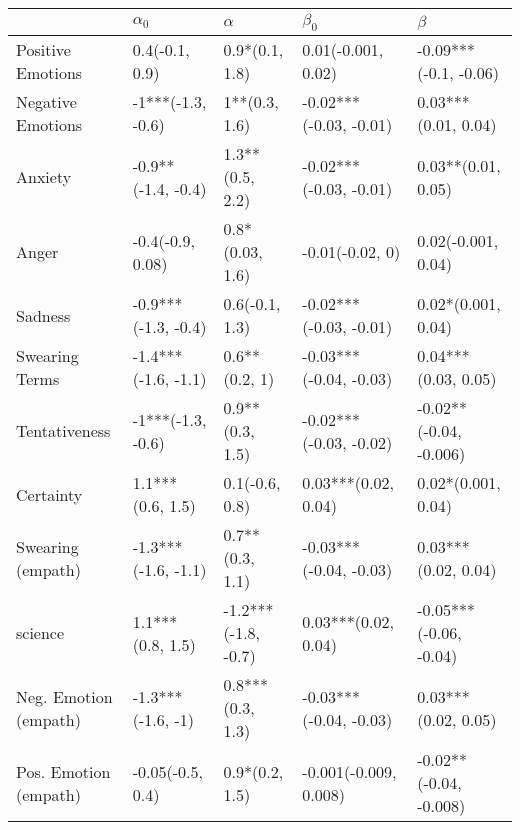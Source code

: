 \begin{tabular}{lllll}
\toprule
{} &           $\alpha_0$ &             $\alpha$ &               $\beta_0$ &                 $\beta$ \\
\midrule
Positive Emotions     &       0.4(-0.1, 0.9) &       0.9*(0.1, 1.8) &      0.01(-0.001, 0.02) &   -0.09***(-0.1, -0.06) \\
Negative Emotions     &    -1***(-1.3, -0.6) &        1**(0.3, 1.6) &  -0.02***(-0.03, -0.01) &     0.03***(0.01, 0.04) \\
Anxiety               &   -0.9**(-1.4, -0.4) &      1.3**(0.5, 2.2) &  -0.02***(-0.03, -0.01) &      0.03**(0.01, 0.05) \\
Anger                 &     -0.4(-0.9, 0.08) &      0.8*(0.03, 1.6) &         -0.01(-0.02, 0) &      0.02(-0.001, 0.04) \\
Sadness               &  -0.9***(-1.3, -0.4) &       0.6(-0.1, 1.3) &  -0.02***(-0.03, -0.01) &      0.02*(0.001, 0.04) \\
Swearing Terms        &  -1.4***(-1.6, -1.1) &        0.6**(0.2, 1) &  -0.03***(-0.04, -0.03) &     0.04***(0.03, 0.05) \\
Tentativeness         &    -1***(-1.3, -0.6) &      0.9**(0.3, 1.5) &  -0.02***(-0.03, -0.02) &  -0.02**(-0.04, -0.006) \\
Certainty             &     1.1***(0.6, 1.5) &       0.1(-0.6, 0.8) &     0.03***(0.02, 0.04) &      0.02*(0.001, 0.04) \\
Swearing (empath)     &  -1.3***(-1.6, -1.1) &      0.7**(0.3, 1.1) &  -0.03***(-0.04, -0.03) &     0.03***(0.02, 0.04) \\
science               &     1.1***(0.8, 1.5) &  -1.2***(-1.8, -0.7) &     0.03***(0.02, 0.04) &  -0.05***(-0.06, -0.04) \\
Neg. Emotion (empath) &    -1.3***(-1.6, -1) &     0.8***(0.3, 1.3) &  -0.03***(-0.04, -0.03) &     0.03***(0.02, 0.05) \\
Pos. Emotion (empath) &     -0.05(-0.5, 0.4) &       0.9*(0.2, 1.5) &   -0.001(-0.009, 0.008) &  -0.02**(-0.04, -0.008) \\
\bottomrule
\end{tabular}

